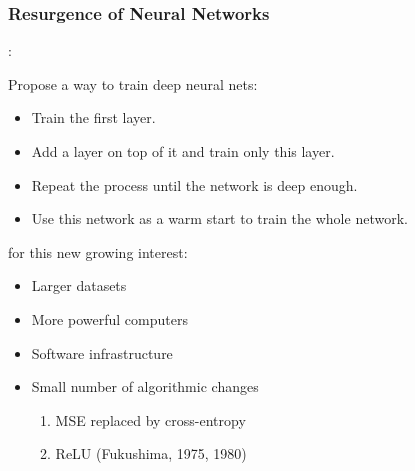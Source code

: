 \begin{frame}
\frametitle{Resurgence of Neural Networks}

:

\smallskip

Propose a way to train deep neural nets:
\begin{itemize}
	\item Train the first layer.
	\item Add a layer on top of it and train only this layer.
	\item Repeat the process until the network is deep enough.
	\item Use this network as a warm start to train the whole network.
\end{itemize}

\bigskip

 for this new growing interest:
\begin{itemize}
	\item Larger datasets
	\item More powerful computers
	\item Software infrastructure
	\item Small number of algorithmic changes
	\begin{enumerate}
		\item MSE replaced by cross-entropy
		\item ReLU (Fukushima, 1975, 1980)
	\end{enumerate}
\end{itemize}
\end{frame}




